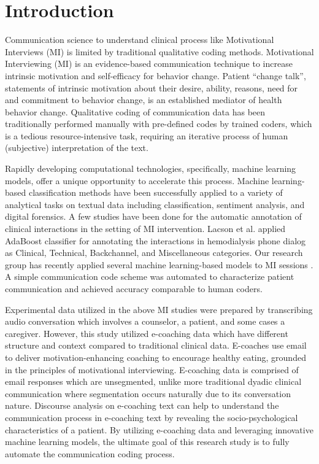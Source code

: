 \documentclass{amia}
\begin{document}
\section*{Introduction}
Communication science to understand clinical process like Motivational Interviews (MI) is limited by traditional qualitative coding methods. Motivational Interviewing (MI) is an evidence-based communication technique to increase intrinsic motivation and self-efficacy for behavior change\cite{miller2012motivational,miller2009ten,miller2009toward}. Patient ``change talk'', statements of intrinsic motivation about their desire, ability, reasons, need for and commitment to behavior change, is an established mediator of health behavior change\cite{apodaca2009mechanisms}. Qualitative coding of communication data has been traditionally performed manually with pre-defined codes by trained coders, which is a tedious resource-intensive task, requiring an iterative process of human (subjective) interpretation of the text.   

Rapidly developing computational technologies, specifically, machine learning models, offer a unique opportunity to accelerate this process. Machine learning-based classification methods have been successfully applied to a variety of analytical tasks on textual data including classification\cite{nigam2000text}, sentiment analysis\cite{wang2012baselines}, and digital forensics\cite{de2002language}. A few studies have been done for the automatic annotation of clinical interactions in the setting of MI intervention. Lacson et al.\cite{lacson2005automatic} applied AdaBoost\cite{freund1999short} classifier for annotating the interactions in hemodialysis phone dialog as Clinical, Technical,
Backchannel, and Miscellaneous categories. Our research group has recently applied several machine learning-based models to MI sessions \cite{hasan2016study,kotov2015interpretable}. A simple communication code scheme was automated to characterize patient communication and achieved accuracy comparable to human coders\cite{hasan2016study}. 

Experimental data utilized in the above MI studies were prepared by transcribing audio conversation which involves a counselor, a patient, and some cases a caregiver\cite{hasan2016study,kotov2015interpretable}. However, this study utilized e-coaching data which have different structure and context compared to traditional clinical data. E-coaches use email to deliver motivation-enhancing coaching to encourage healthy eating, grounded in the principles of motivational interviewing. E-coaching data is comprised of email responses which are unsegmented, unlike more traditional dyadic clinical communication where segmentation occurs naturally due to its conversation nature. Discourse analysis on e-coaching text can help to understand the communication process in e-coaching text by revealing the socio-psychological characteristics of a patient\cite{siegfried1995therapeutic,kalchbrenner2013recurrent,pierre2016neural}. By utilizing e-coaching data and leveraging innovative machine learning models, the ultimate goal of this research study is to fully automate the communication coding process.
\end{document}
